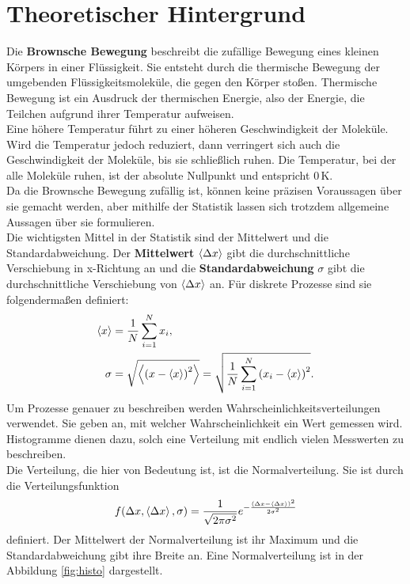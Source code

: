 \section*{Theoretischer Hintergrund}

Die \textbf{Brownsche Bewegung} beschreibt die zufällige Bewegung eines kleinen Körpers in einer Flüssigkeit. Sie entsteht durch die thermische Bewegung der umgebenden Flüssigkeitsmoleküle, die gegen den Körper stoßen.
Thermische Bewegung ist ein Ausdruck der thermischen Energie, also der Energie, die Teilchen aufgrund ihrer Temperatur aufweisen.\\
Eine höhere Temperatur führt zu einer höheren Geschwindigkeit der Moleküle. Wird die Temperatur jedoch reduziert, dann verringert sich auch die Geschwindigkeit der Moleküle, bis sie schließlich ruhen. Die Temperatur, bei der alle Moleküle ruhen, ist der absolute Nullpunkt und entspricht $0 \,$K.\\

Da die Brownsche Bewegung zufällig ist, können keine präzisen Voraussagen über sie gemacht werden, aber mithilfe der Statistik lassen sich trotzdem allgemeine Aussagen über sie formulieren.\\
Die wichtigsten Mittel in der Statistik sind der Mittelwert und die Standardabweichung. Der \textbf{Mittelwert} $\left< \Delta x \right>$ gibt die durchschnittliche Verschiebung in x-Richtung an und die \textbf{Standardabweichung} $\sigma$ gibt die durchschnittliche Verschiebung von $\left< \Delta x \right>$ an. Für diskrete Prozesse sind sie folgendermaßen definiert:
\begin{align}
  \left< x \right> & = \frac{1}{N} \sum_{i=1}^{N} x_i, \\
  \sigma & = \sqrt{\left<  {\left( x - \left< x \right> \right)}^2  \right>} = \sqrt{\frac{1}{N} \sum_{i=1}^{N} {\left( x_i - \left< x \right> \right)}^2}.
\end{align}
Um Prozesse genauer zu beschreiben werden Wahrscheinlichkeitsverteilungen verwendet. Sie geben an, mit welcher Wahrscheinlichkeit ein Wert gemessen wird. Histogramme dienen dazu, solch eine Verteilung mit endlich vielen Messwerten zu beschreiben.\\
Die Verteilung, die hier von Bedeutung ist, ist die Normalverteilung. Sie ist durch die Verteilungsfunktion
\begin{equation}
  f(\Delta x, \left< \Delta x \right>, \sigma) = \frac{1}{\sqrt{2 \pi \sigma^2}} e^{- \frac{(\Delta x - \left< \Delta x \right>)^2}{2 \sigma^2}} \label{eq:gauss}
\end{equation}
definiert. Der Mittelwert der Normalverteilung ist ihr Maximum und die Standardabweichung gibt ihre Breite an. Eine Normalverteilung ist in der Abbildung \ref{fig:histo} dargestellt.\\

